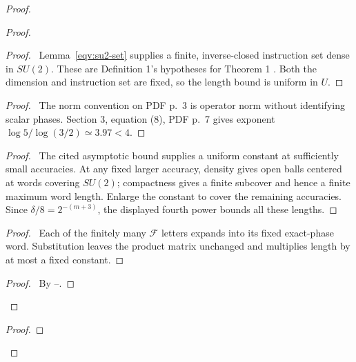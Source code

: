 \begin{proof}
\begin{proof}
 \begin{proof}\pf\ Lemma~\ref{eqv:su2-set} supplies a finite,
 inverse-closed instruction set dense in $SU(2)$. These are
 Definition 1's hypotheses for Theorem 1
 \cite[PDF pp.~2, 4]{DawsonNielsen2006}. Both the dimension and
 instruction set are fixed, so the length bound is uniform in $U$.
 \end{proof}
 \begin{proof}\pf\ The norm convention on PDF p.~3 is operator
 norm without identifying scalar phases. Section 3, equation (8),
 PDF p.~7 gives exponent $\log5/\log(3/2)\simeq3.97<4$.
 \end{proof}
 \begin{proof}\pf\ The cited asymptotic bound supplies a uniform
 constant at sufficiently small accuracies. At any fixed larger
 accuracy, density gives open balls centered at words covering
 $SU(2)$; compactness gives a finite subcover and hence a finite
 maximum word length. Enlarge the constant to cover the remaining
 accuracies. Since $\delta/8=2^{-(m+3)}$, the displayed fourth
 power bounds all these lengths.\end{proof}
 \begin{proof}\pf\ Each of the finitely many $\mathcal F$ letters
 expands into its fixed exact-phase word. Substitution leaves the
 product matrix unchanged and multiplies length by at most a fixed
 constant.\end{proof}
 \qedstep
 \begin{proof}\pf\ By --.
 \end{proof}
\end{proof}
 \begin{proof}
\end{proof}
\end{proof}
